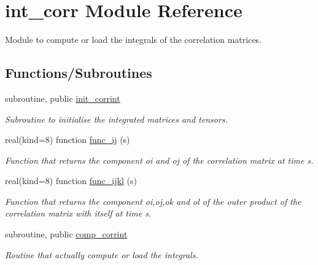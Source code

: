 \hypertarget{namespaceint__corr}{}\section{int\+\_\+corr Module Reference}
\label{namespaceint__corr}


Module to compute or load the integrals of the correlation matrices.  


\subsection*{Functions/\+Subroutines}
\begin{DoxyCompactItemize}
\item 
subroutine, public \hyperlink{namespaceint__corr_afb525a8e7ea02313d6480ffbbd265b3b}{init\+\_\+corrint}
\begin{DoxyCompactList}\small\item\em Subroutine to initialise the integrated matrices and tensors. \end{DoxyCompactList}\item 
real(kind=8) function \hyperlink{namespaceint__corr_a311d5bd56c8de0d259e934f50d5388eb}{func\+\_\+ij} (s)
\begin{DoxyCompactList}\small\item\em Function that returns the component oi and oj of the correlation matrix at time s. \end{DoxyCompactList}\item 
real(kind=8) function \hyperlink{namespaceint__corr_af4796390cac83adc24081fa81a54af27}{func\+\_\+ijkl} (s)
\begin{DoxyCompactList}\small\item\em Function that returns the component oi,oj,ok and ol of the outer product of the correlation matrix with itself at time s. \end{DoxyCompactList}\item 
subroutine, public \hyperlink{namespaceint__corr_ac65d143c4217bb56f7c4168506c2fd4f}{comp\+\_\+corrint}
\begin{DoxyCompactList}\small\item\em Routine that actually compute or load the integrals. \end{DoxyCompactList}\end{DoxyCompactItemize}
